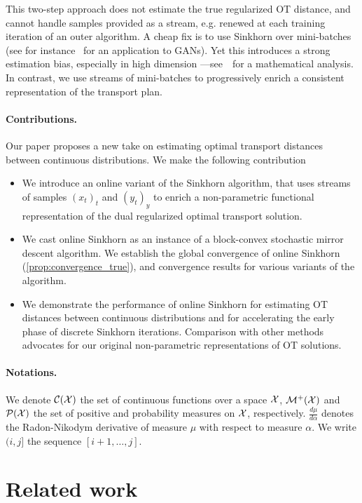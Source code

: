 This two-step approach does not estimate the true regularized OT
distance, and cannot handle samples provided as a stream, e.g. renewed at each
training iteration of an outer algorithm. A cheap fix is to use Sinkhorn over
mini-batches (see for instance~\citet{2018-Genevay-aistats} for an application
to GANs). Yet this introduces a strong estimation bias, especially in high
dimension ---see~\citet{fatras2019learning} for a mathematical analysis. In
contrast, we use streams of mini-batches to progressively enrich a consistent representation of the
transport plan.

\paragraph{Contributions.} Our paper proposes a new take on estimating optimal transport distances between continuous distributions. We make the following contribution
\begin{itemize}
    \item We introduce an online variant of the Sinkhorn algorithm, that uses
    streams of samples $(x_t)_t$ and $(y_t)_y$ to enrich a non-parametric
    functional representation of the dual regularized optimal transport solution.
    \item We cast online Sinkhorn as an instance of a block-convex stochastic
    mirror descent algorithm. We establish the global convergence of online
    Sinkhorn (\autoref{prop:convergence_true}), and convergence results for
    various variants of the algorithm.
    \item We demonstrate the performance of online Sinkhorn for estimating OT
    distances between continuous distributions and for accelerating the early
    phase of discrete Sinkhorn iterations. Comparison with other methods
    advocates for our original non-parametric representations of OT solutions.
\end{itemize}

\paragraph{Notations.} We denote $\mathcal{C}(\mathcal{X})$ the set of continuous functions over
a space $\mathcal{X}$, $\mathcal{M}^+(\mathcal{X})$ and $\mathcal{P}(\mathcal{X})$ the set of positive and probability
measures on $\mathcal{X}$, respectively. $\frac{d \mu}{d \alpha}$ denotes the
Radon-Nikodym derivative of measure $\mu$ with respect to measure $\alpha$. We
write $(i, j]$ the sequence $[i+1, \dots, j]$.


\section{Related work}\label{sec:related}

